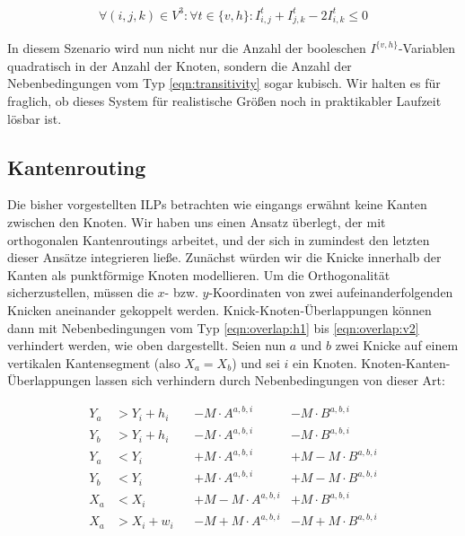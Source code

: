 \begin{align}
	\forall (i,j,k) \in V^3 : \forall t \in \{v,h\} :  I^{t}_{i,j} + I^{t}_{j,k} - 2 I^{t}_{i,k} \leq 0 \label{eqn:transitivity}
\end{align}

In diesem Szenario wird nun nicht nur die Anzahl der booleschen $I^{\{v,h\}}$-Variablen quadratisch in der Anzahl der Knoten, sondern die Anzahl der Nebenbedingungen vom Typ \ref{eqn:transitivity} sogar kubisch. Wir halten es für fraglich, ob dieses System für realistische Größen noch in praktikabler Laufzeit lösbar ist.

\subsection{Kantenrouting}
\label{sub:edgeroute}

Die bisher vorgestellten ILPs betrachten wie eingangs erwähnt keine Kanten zwischen den Knoten. Wir haben uns einen Ansatz überlegt, der mit orthogonalen Kantenroutings arbeitet, und der sich in zumindest den letzten dieser Ansätze integrieren ließe. Zunächst würden wir die Knicke innerhalb der Kanten als punktförmige Knoten modellieren. Um die Orthogonalität sicherzustellen, müssen die $x$- bzw. $y$-Koordinaten von zwei aufeinanderfolgenden Knicken aneinander gekoppelt werden. Knick-Knoten-Überlappungen können dann mit Nebenbedingungen vom Typ \ref{eqn:overlap:h1} bis \ref{eqn:overlap:v2} verhindert werden, wie oben dargestellt. Seien nun $a$ und $b$ zwei Knicke auf einem vertikalen Kantensegment (also $X_a = X_b$) und sei $i$ ein Knoten. Knoten-Kanten-Überlappungen lassen sich verhindern durch Nebenbedingungen von dieser Art:

\begin{align}
	Y_a &> Y_{i} + h_i &&- M \cdot A^{a,b,i} & - M \cdot B^{a,b,i} \label{eqn:edgeover:v1} \\
	Y_b &> Y_{i} + h_i &&- M \cdot A^{a,b,i} & - M \cdot B^{a,b,i} \label{eqn:edgeover:v2}\\
	Y_a &< Y_{i}  &&+ M \cdot A^{a,b,i} & + M - M \cdot B^{a,b,i} \label{eqn:edgeover:v3}\\
	Y_b &< Y_{i}  &&+ M \cdot A^{a,b,i} & + M - M \cdot B^{a,b,i} \label{eqn:edgeover:v4}\\
	X_a &< X_i &&+ M - M \cdot A^{a,b,i} & + M \cdot B^{a,b,i} \label{eqn:edgeover:h1}\\
	X_a &> X_i + w_i &&- M + M \cdot A^{a,b,i} & -M + M \cdot B^{a,b,i} \label{eqn:edgeover:h2}
\end{align}

